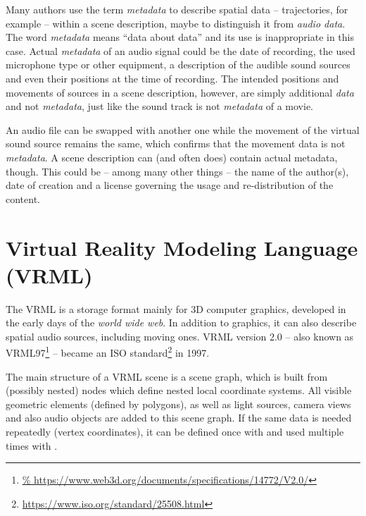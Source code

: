 Many authors use the term \emph{metadata} to describe
spatial data -- trajectories, for example -- within a scene description,
maybe to distinguish it from \emph{audio data}.
The word \emph{metadata} means ``data about data''
and its use is inappropriate in this case.
Actual \emph{metadata} of an audio signal could be the date of recording,
the used microphone type or other equipment,
a description of the audible sound sources
and even their positions at the time of recording.
The intended positions and movements of sources in a scene description,
however,
are simply additional \emph{data} and not \emph{metadata},
just like the sound track is not \emph{metadata} of a movie.

An audio file can be swapped with another one
while the movement of the virtual sound source remains the same,
which confirms that the movement data is not \emph{metadata}.
A scene description can (and often does) contain actual metadata, though.
This could be -- among many other things --
the name of the author(s), date of creation
and a license governing the usage and re-distribution of the content.


\section{Virtual Reality Modeling Language (VRML)}
\label{sec:VRML}

The VRML is a storage format
mainly for 3D computer graphics,
developed in the early days of the \emph{world wide web}.
In addition to graphics,
it can also describe spatial audio sources,
including moving ones.
VRML version 2.0 -- also known as
VRML97\footnote{\url{%
https://www.web3d.org/documents/specifications/14772/V2.0/}}
--
became an ISO standard\footnote{\url{https://www.iso.org/standard/25508.html}}
in 1997.

The main structure of a VRML scene
is a scene graph,
which is built from (possibly nested)  nodes which define
nested local coordinate systems.
All visible geometric elements (defined by polygons),
as well as light sources, camera views
and also audio objects are added to this scene graph.
If the same data is needed repeatedly (\eg vertex coordinates),
it can be defined once with 
and used multiple times with .

